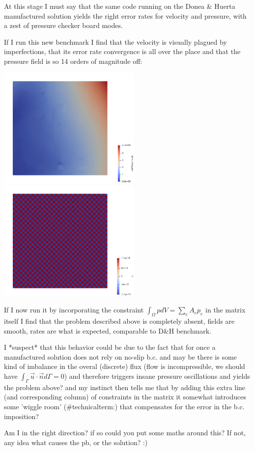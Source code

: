At this stage I must say that the same code running on the Donea \& Huerta manufactured
solution yields the right error rates for velocity and pressure, with a zest of pressure 
checker board modes.

If I run this new benchmark I find that the velocity is visually plagued by imperfections, 
that its error rate convergence is all over the place and that the pressure field 
is so 14 orders of magnitude off:

\begin{center}
\includegraphics[width=7cm]{../results/exp09/velpb.png}
\includegraphics[width=7cm]{../results/exp09/presspb.png}
\end{center}

If I now run it by incorporating the constraint $\int_\Omega p dV = \sum_e A_e p_e$ in the 
matrix itself I find that the problem described above is completely absent, fields are smooth, 
rates are what is expected, comparable to D\&H benchmark. 

I *suspect* that this behavior could be due to the fact that for once a manufactured solution 
does not rely on no-slip b.c. and may be there is some kind of imbalance in the overal (discrete)
flux (flow is incompressible, we should have $\int_\Gamma \vec{u}\cdot\vec{n}d\Gamma=0$) 
and therefore triggers insane pressure oscillations and 
yields the problem above? and my instinct then tells me that 
by adding this extra line (and corresponding column) of constraints in the matrix it somewhat 
introduces some 'wiggle room' (\#technicalterm:) that compensates for the error in the b.c. imposition?
 
Am I in the right direction? if so could you put some maths around this? 
If not, any idea what causes the pb, or the solution? :)
 







